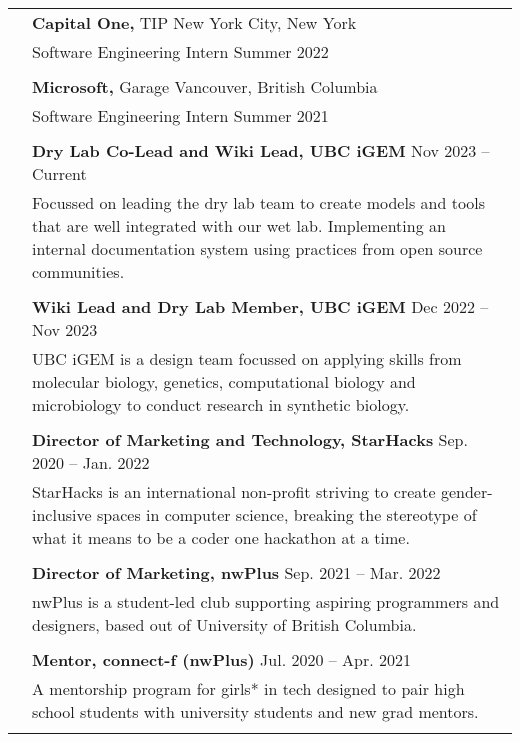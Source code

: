 \documentclass[letterpaper, 11pt]{article}
\begin{document}
\begin{longtable}{p{1.3in}p{4.8in}}
{\color{Blue}{Industry Experience}}
& {\textbf{Capital One,}} TIP \hfill New York City, New York\\
& Software Engineering Intern \hfill Summer 2022 \\
& \\
 
& {\textbf{Microsoft,}} Garage \hfill Vancouver, British Columbia\\
& Software Engineering Intern \hfill Summer 2021 \\
& \\

\color{Blue}{Service and outreach}
& \textbf{Dry Lab Co-Lead and Wiki Lead, UBC iGEM} \hfill Nov 2023 -- Current \\
& Focussed on leading the dry lab team to create models and tools that are well integrated with our wet lab. Implementing an internal documentation system using practices from open source communities. \\
& \\

& \textbf{Wiki Lead and Dry Lab Member, UBC iGEM} \hfill Dec 2022 -- Nov 2023 \\
& UBC iGEM is a design team focussed on applying skills from molecular biology, genetics, computational biology and microbiology to conduct research in synthetic biology. \\
& \\

& \textbf{Director of Marketing and Technology, StarHacks} \hfill Sep. 2020 -- Jan. 2022 \\
& StarHacks is an international non-profit striving to create gender-inclusive spaces in computer science, breaking the stereotype of what it means to be a coder one hackathon at a time. \\
& \\

& \textbf{Director of Marketing, nwPlus} \hfill Sep. 2021 -- Mar. 2022 \\
& nwPlus is a student-led club supporting aspiring programmers and designers, based out of University of British Columbia. \\
& \\

& \textbf{Mentor, connect-f (nwPlus)} \hfill Jul. 2020 -- Apr. 2021 \\
& A mentorship program for girls* in tech designed to pair high school students with university students and new grad mentors.  \\
& \\


\end{longtable}
\end{document}
